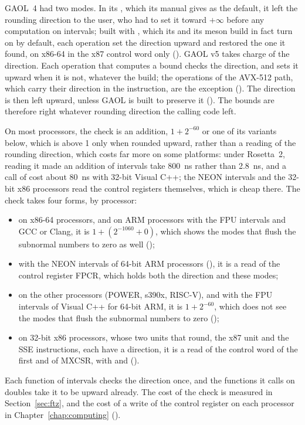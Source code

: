\medskip
GAOL~4 had two modes. In its , which its manual gives
as the default, it left the rounding direction to the user, who had to set it
toward $+\infty$ before any computation on intervals; built with
, which its  and its meson
build in fact turn on by default, each operation set the direction upward and
restored the one it found, on x86-64 in the x87 control word only
(). GAOL v5 takes charge of the
direction.\newinvfive{} Each
operation that computes a bound checks the direction, and sets it upward when
it is not, whatever the build; the operations of the AVX-512 path, which carry
their direction in the instruction, are the exception ().
The direction is then left upward, unless GAOL is built to preserve it
(). The bounds are therefore right whatever
rounding direction the calling code left.
%

\medskip
On most processors, the check is an addition, $1+2^{-60}$ or one of its
variants below, which is above 1 only when rounded upward, rather than a
reading of the rounding direction, which costs far more on some platforms:
under Rosetta~2, reading it made an addition of intervals take 800~ns rather
than 2.8~ns, and a call of  cost about 80~ns with 32-bit
Visual C++; the NEON intervals and the 32-bit x86 processors read the control
registers themselves, which is cheap there. The check takes four forms, by
processor:
\begin{itemize}
\item on x86-64 processors, and on ARM processors with the FPU intervals and
  GCC or Clang, it is
  $1+(2^{-1060}+0)$, which shows the modes that flush the subnormal numbers to
  zero as well ();
\item with the NEON intervals of 64-bit ARM processors (), it
  is a read of the control register FPCR, which holds both the direction and
  these modes;
\item on the other processors (POWER, s390x, RISC-V), and with the FPU
  intervals of Visual C++ for 64-bit ARM, it is $1+2^{-60}$, which does not
  see the modes that flush the subnormal numbers to zero ();
\item on 32-bit x86 processors, whose two units that round, the x87 unit and
  the SSE instructions, each have a direction, it is a read of the control
  word of the first and of MXCSR, with  and 
  ().\newinvfive
\end{itemize}
\noindent
Each function of intervals checks the direction once, and the functions it
calls on doubles take it to be upward already. The cost of the check is
measured in Section~\ref{sec:ftz}, and the cost of a write of the control
register on each processor in Chapter~\ref{chap:computing}
().

